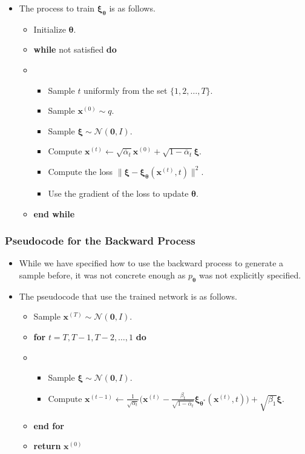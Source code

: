 \documentclass[10pt]{article}
\newcommand{\ve}[1]{\mathbf{#1}}
\newcommand{\ves}[1]{\boldsymbol{#1}}
\newcommand{\mcal}[1]{\mathcal{#1}}
\newcommand{\x}{\mathbf{x}}
\begin{document}
\begin{itemize}
  \item The process to train $\ves{\xi}_{\ves{\theta}}$ is as follows.
  \begin{itemize}
    \item[] Initialize $\ves{\theta}$.
    \item[] {\bf while} not satisfied {\bf do}
    \item[] \begin{itemize}
      \item[] Sample $t$ uniformly from the set $\{ 1, 2, \dotsc, T \}$.
      \item[] Sample $\ve{x}^{(0)} \sim q$.
      \item[] Sample $\ves{\xi} \sim \mcal{N}(\ve{0}, I)$.
      \item[] Compute $\ve{x}^{(t)} \gets \sqrt{\overline{\alpha}_t}\ve{x}^{(0)} + \sqrt{1 - \overline{\alpha}_t} \ves{\xi}$.
      \item[] Compute the loss $\| \ves{\xi} - \ves{\xi}_{\ves{\theta}}(\ve{\x}^{(t)}, t) \|^2.$
      \item[] Use the gradient of the loss to update $\ves{\theta}$.
    \end{itemize}
    \item[] {\bf end while}
  \end{itemize}
\end{itemize}

\subsubsection{Pseudocode for the Backward Process}

\begin{itemize}
  \item While we have specified how to use the backward process to generate a sample before, it was not concrete enough as $p_{\ves{\theta}}$ was not explicitly specified.
  
  \item The pseudocode that use the trained network is as follows.
  \begin{itemize}
    \item[] Sample $\ve{x}^{(T)} \sim \mcal{N}(\ve{0}, I)$.
    \item[] {\bf for} $t = T, T-1, T-2, \dotsc, 1$ {\bf do}
    \item[] \begin{itemize}
      \item[] Sample $\ves{\xi} \sim \mcal{N}(\ve{0},I)$.
      \item[] Compute $\ve{x}^{(t-1)} \gets \frac{1}{\sqrt{\alpha_t}}\Big( \ve{x}^{(t)} - \frac{\beta_t}{\sqrt{1 - \overline{\alpha}_t}} \ves{\xi}_{\ves{\theta}^*}(\ve{x}^{(t)},t) \Big) + \sqrt{\beta_1} \ves{\xi}.$ 
    \end{itemize}
    \item[] {\bf end for}
    \item[] {\bf return} $\ve{x}^{(0)}$
  \end{itemize}  
\end{itemize}
\end{document}

